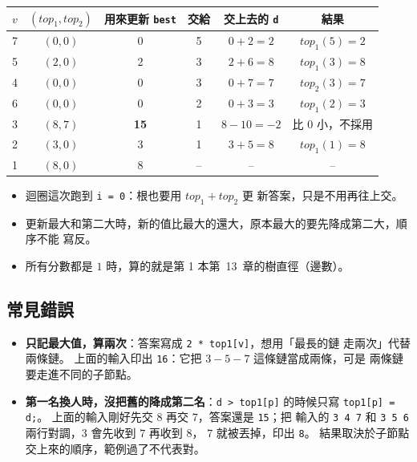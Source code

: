 \begin{center}
\begin{tabular}{cccccc}
\toprule
$v$ & $(\mathit{top}_1, \mathit{top}_2)$ & 用來更新 \texttt{best} & 交給 & 交上去的 \texttt{d} & 結果 \\
\midrule
7 & $(0, 0)$ & 0 & 5 & $0 + 2 = 2$ & $\mathit{top}_1(5) = 2$ \\
5 & $(2, 0)$ & 2 & 3 & $2 + 6 = 8$ & $\mathit{top}_1(3) = 8$ \\
4 & $(0, 0)$ & 0 & 3 & $0 + 7 = 7$ & $\mathit{top}_2(3) = 7$ \\
6 & $(0, 0)$ & 0 & 2 & $0 + 3 = 3$ & $\mathit{top}_1(2) = 3$ \\
3 & $(8, 7)$ & \textbf{15} & 1 & $8 - 10 = -2$ & 比 $0$ 小，不採用 \\
2 & $(3, 0)$ & 3 & 1 & $3 + 5 = 8$ & $\mathit{top}_1(1) = 8$ \\
1 & $(8, 0)$ & 8 & -- & -- & -- \\
\bottomrule
\end{tabular}
\end{center}

\begin{itemize}
\item 迴圈這次跑到 \texttt{i = 0}：根也要用 $\mathit{top}_1 + \mathit{top}_2$ 更
新答案，只是不用再往上交。
\item 更新最大和第二大時，新的值比最大的還大，原本最大的要先降成第二大，順序不能
寫反。
\item 所有分數都是 $1$ 時，算的就是第 1 本第~13~章的樹直徑（邊數）。
\end{itemize}

\subsection{常見錯誤}

\begin{itemize}
\item \textbf{只記最大值，算兩次}：答案寫成 \texttt{2 * top1[v]}，想用「最長的鏈
走兩次」代替兩條鏈。 上面的輸入印出 \texttt{16}：它把 $3 - 5 - 7$ 這條鏈當成兩條，可是
兩條鏈要走進不同的子節點。
\item \textbf{第一名換人時，沒把舊的降成第二名}：\texttt{d > top1[p]} 的時候只寫
\texttt{top1[p] = d;}。 上面的輸入剛好先交 $8$ 再交 $7$，答案還是 \texttt{15}；把
輸入的 \texttt{3 4 7} 和 \texttt{3 5 6} 兩行對調，$3$ 會先收到 $7$ 再收到 $8$，
$7$ 就被丟掉，印出 \texttt{8}。 結果取決於子節點交上來的順序，範例過了不代表對。
\end{itemize}

